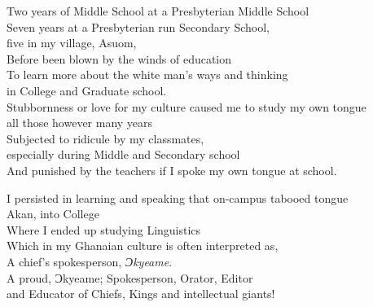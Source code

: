 \begin{refsection}
\noindent Two years of Middle School at a Presbyterian Middle School\\
Seven years at a Presbyterian run Secondary School,\\
\hspace*{10mm}five in my village, Asuom,\\
Before been blown by the winds of education\\
To learn more about the white man’s ways and thinking\\
\hspace*{10mm}in College and Graduate school.\\
Stubbornness or love for my culture caused me to study my own tongue\\ \hspace*{10mm}all those however many years\\
Subjected to ridicule by my classmates,\\
\hspace*{10mm}especially during Middle and Secondary school\\
And punished by the teachers if I spoke my own tongue at school.\\
\newpage

\noindent I persisted in learning and speaking that on-campus tabooed tongue\\
\hspace*{10mm}Akan, into College\\
Where I ended up studying Linguistics\\
Which in my Ghanaian culture is often interpreted as, \\
A chief’s spokesperson, \textit{Ɔkyeame}.\\
A proud, Ɔkyeame; Spokesperson, Orator, Editor\\
\hspace*{10mm}and Educator of Chiefs, Kings and intellectual giants!\\


\end{refsection}
